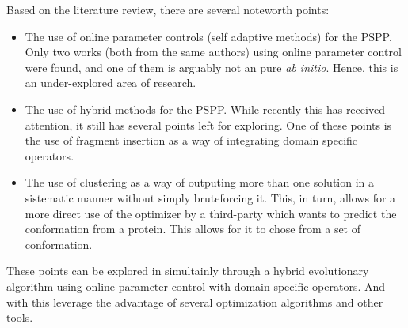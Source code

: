 Based on the literature review, there are several noteworth points:
\begin{itemize}
    \item The use of online parameter controls (self adaptive methods) for the PSPP.
    Only two works (both from the same authors) using online parameter control
    were found, and one of them is arguably not an pure \textit{ab initio}.
    Hence, this is an under-explored area of research.
    \item The use of hybrid methods for the PSPP. While recently this has received
    attention, it still has several points left for exploring. One of these points
    is the use of fragment insertion as a way of integrating domain specific operators.
    \item The use of clustering as a way of outputing more than one solution in a
    sistematic manner without simply bruteforcing it. This, in turn, allows for
    a more direct use of the optimizer by a third-party which wants to predict the
    conformation from a protein. This allows for it to chose from a set of conformation.
\end{itemize}

These points can be explored in simultainly through a hybrid evolutionary
algorithm using online parameter control with domain specific operators. And with
this leverage the advantage of several optimization algorithms and other tools.
